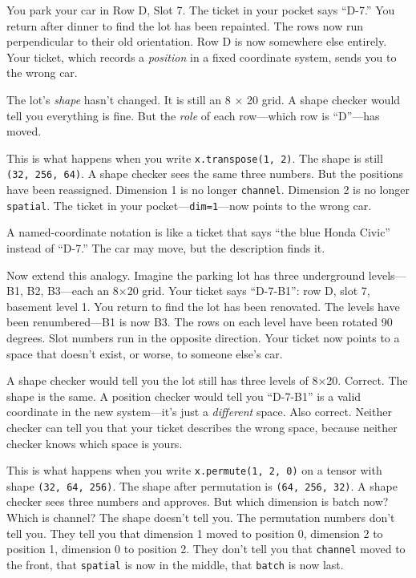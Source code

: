 \documentclass[11pt,titlepage]{article}
\begin{document}
You park your car in Row D, Slot 7. The ticket in your pocket says
``D-7.'' You return after dinner to find the lot has been repainted. The
rows now run perpendicular to their old orientation. Row D is now
somewhere else entirely. Your ticket, which records a \emph{position} in
a fixed coordinate system, sends you to the wrong car.

The lot's \emph{shape} hasn't changed. It is still an 8 × 20 grid. A
shape checker would tell you everything is fine. But the \emph{role} of
each row---which row is ``D''---has moved.

This is what happens when you write \texttt{x.transpose(1,\ 2)}. The
shape is still \texttt{(32,\ 256,\ 64)}. A shape checker sees the same
three numbers. But the positions have been reassigned. Dimension 1 is no
longer \texttt{channel}. Dimension 2 is no longer \texttt{spatial}. The
ticket in your pocket---\texttt{dim=1}---now points to the wrong car.

A named-coordinate notation is like a ticket that says ``the blue Honda
Civic'' instead of ``D-7.'' The car may move, but the description finds
it.

Now extend this analogy. Imagine the parking lot has three underground
levels---B1, B2, B3---each an 8×20 grid. Your ticket says ``D-7-B1'':
row D, slot 7, basement level 1. You return to find the lot has been
renovated. The levels have been renumbered---B1 is now B3. The rows on
each level have been rotated 90 degrees. Slot numbers run in the
opposite direction. Your ticket now points to a space that doesn't
exist, or worse, to someone else's car.

A shape checker would tell you the lot still has three levels of 8×20.
Correct. The shape is the same. A position checker would tell you
``D-7-B1'' is a valid coordinate in the new system---it's just a
\emph{different} space. Also correct. Neither checker can tell you that
your ticket describes the wrong space, because neither checker knows
which space is yours.

This is what happens when you write \texttt{x.permute(1,\ 2,\ 0)} on a
tensor with shape \texttt{(32,\ 64,\ 256)}. The shape after permutation
is \texttt{(64,\ 256,\ 32)}. A shape checker sees three numbers and
approves. But which dimension is batch now? Which is channel? The shape
doesn't tell you. The permutation numbers don't tell you. They tell you
that dimension 1 moved to position 0, dimension 2 to position 1,
dimension 0 to position 2. They don't tell you that \texttt{channel}
moved to the front, that \texttt{spatial} is now in the middle, that
\texttt{batch} is now last.
\end{document}
